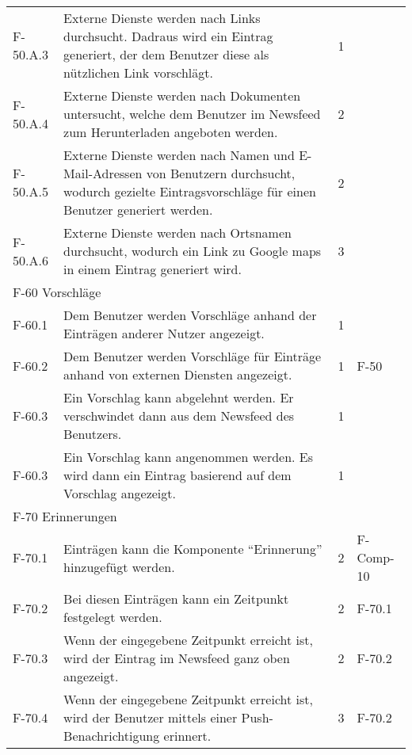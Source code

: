 \begin{tabularx}{\textwidth}{|l|X|l|l|}
    F-50.A.3 & Externe Dienste werden nach Links durchsucht. Dadraus wird ein Eintrag generiert, der dem Benutzer diese als nützlichen Link vorschlägt. & 1 & \\
    F-50.A.4 & Externe Dienste werden nach Dokumenten untersucht, welche dem Benutzer im Newsfeed zum Herunterladen angeboten werden. & 2 & \\
    F-50.A.5 & Externe Dienste werden nach Namen und E-Mail-Adressen von Benutzern durchsucht, wodurch gezielte Eintragsvorschläge für einen Benutzer generiert werden. & 2 & \\
    F-50.A.6 & Externe Dienste werden nach Ortsnamen durchsucht, wodurch ein Link zu Google maps in einem Eintrag generiert wird. & 3 & \\
    \hline
    \multicolumn{4}{|l|}{F-60 Vorschläge}\\
    \hline 
    F-60.1 & Dem Benutzer werden Vorschläge anhand der Einträgen anderer Nutzer angezeigt. & 1 & \\
    F-60.2 & Dem Benutzer werden Vorschläge für Einträge anhand von externen Diensten angezeigt. & 1 & F-50 \\
    F-60.3 & Ein Vorschlag kann abgelehnt werden. Er verschwindet dann aus dem Newsfeed des Benutzers. & 1 & \\
    F-60.3 & Ein Vorschlag kann angenommen werden. Es wird dann ein Eintrag basierend auf dem Vorschlag angezeigt. & 1 & \\
    \hline
    \multicolumn{4}{|l|}{F-70 Erinnerungen}\\
    \hline
    F-70.1 & Einträgen kann die Komponente \enquote{Erinnerung} hinzugefügt werden. & 2 & F-Comp-10 \\
    F-70.2 & Bei diesen Einträgen kann ein Zeitpunkt festgelegt werden. & 2 & F-70.1 \\
    F-70.3 & Wenn der eingegebene Zeitpunkt erreicht ist, wird der Eintrag im Newsfeed ganz oben angezeigt. & 2 & F-70.2 \\
    F-70.4 & Wenn der eingegebene Zeitpunkt erreicht ist, wird der Benutzer mittels einer Push-Benachrichtigung erinnert. & 3 & F-70.2 \\
    \hline


\end{tabularx}
